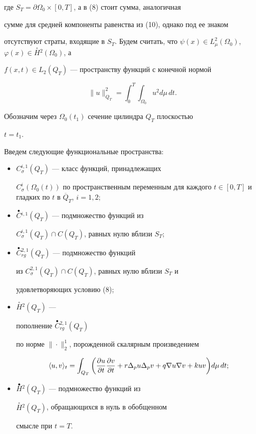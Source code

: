 где $S_T=\partial \Omega_0 \times [0,T]$, а в (8) стоит сумма, аналогичная 


сумме для средней компоненты равенства из (10), однако под ее знаком 


отсутствуют страты, входящие в $S_T$. Будем считать, что $\psi(x)\in 


L^2_\mu(\Omega_0)$, $\varphi(x)\in\overset{\circ}{H}{}^2(\Omega_0)$, а 


$f(x,t)\in L_2(Q_T)$ --- пространству функций с конечной нормой 


$$ 


\|u\|^2_{Q_T}=\int^T_0\int_{\Omega_0}u^2d\mu\,d t. 


$$ 


Обозначим через $\Omega_0 (t_1)$ сечение цилиндра $Q_T$ плоскостью 


$t=t_1$. 


Введем следующие функциональные пространства: 


\begin{itemize} 


\item[] $C^{i,1}_\sigma (Q_T)$ --- класс функций, принадлежащих 


$C^{i}_\sigma 


(\Omega_0 (t))$ по пространственным переменным для каждого $t \in 


[0,T]$ и гладких по $t$ в $\overline{Q}_T$, $i=1,2$; 


\item[] $\overset{\bullet}{C}{}^{i,1}(Q_T)$ --- подмножество функций из 


$C^{i,1}_\sigma (Q_T)\cap C(Q_T)$, равных нулю вблизи $S_T$; 


\item[] $\overset{\bullet}{C}{}^{2,1}_{rg}(Q_T)$ --- подмножество функций 


из $C^{2,1}_\sigma(Q_T)\cap C(Q_T)$, равных нулю вблизи $S_T$ и 


удовлетворяющих условию (8); 


\item[] $\overset{\circ}{H}{}^2(Q_T)$ --- 


пополнение $\overset{\bullet}{C}{}^{2,1}_{rg}(Q_T)$ 


по норме $\|\cdot\|_2^1$, порожденной скалярным произведением 


$$ 


\la u,v\ra_t=\int_{Q_T}{\bigg(\frac{\partial u}{\partial t}\frac{\partial v} 


{\partial t}+r\Delta_p u\Delta_p v+ 


q\nabla u \nabla v + k u v\bigg)}d\mu\,d t;


$$ 


\item[] $\overset{\bullet}{H}{}^2(Q_T)$ --- подмножество функций из 


$\overset{\circ}{H}{}^2(Q_T)$, обращающихся в нуль в обобщенном 


смысле при $t=T$. 


\end{itemize} 


